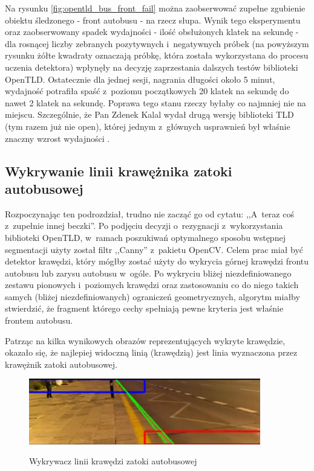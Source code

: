 Na rysunku \ref{fig:opentld_bus_front_fail} można zaobserwować 
zupełne zgubienie obiektu 
śledzonego - 
front autobusu - na rzecz słupa. Wynik tego eksperymentu oraz
zaobserwowany spadek wydajności - ilość obsłużonych klatek na sekundę - 
dla rosnącej liczby zebranych pozytywnych i~negatywnych próbek
(na powyższym rysunku żółte kwadraty oznaczają próbkę, która została
wykorzystana do procesu uczenia detektora) 
wpłynęły na decyzję zaprzestania dalszych testów biblioteki OpenTLD.
Ostatecznie dla jednej sesji,
nagrania długości około 5 minut, wydajność potrafiła spaść z~poziomu
początkowych 20 klatek na sekundę do nawet 2 klatek na sekundę.
Poprawa tego stanu 
rzeczy byłaby co najmniej nie na miejscu. Szczególnie, że Pan 
Zdenek Kalal wydał drugą wersję biblioteki TLD (tym razem już nie 
open), której jednym z~głównych usprawnień był właśnie znaczny 
wzrost wydajności
\cite{WEB:kalaltld2}.

\subsection{Wykrywanie linii krawężnika zatoki autobusowej}

Rozpoczynając ten podrozdział, trudno nie zacząć go od cytatu:
,,A~teraz coś z~zupełnie innej beczki''. Po podjęciu decyzji o~rezygnacji
z~wykorzystania
biblioteki OpenTLD, w~ramach poszukiwań optymalnego sposobu wstępnej
segmentacji użyty został filtr ,,Canny'' z~pakietu OpenCV. Celem prac
miał być detektor krawędzi, który mógłby zostać użyty do
wykrycia górnej krawędzi frontu autobusu lub zarysu autobusu w~ogóle.
Po wykryciu bliżej niezdefiniowanego zestawu pionowych i~poziomych
krawędzi oraz zastosowaniu co do niego takich samych (bliżej
niezdefiniowanych) ograniczeń geometrycznych, algorytm miałby
stwierdzić, że fragment którego cechy spełniają pewne kryteria jest
właśnie frontem autobusu.

Patrząc na kilka wynikowych obrazów reprezentujących wykryte krawędzie,
okazało się, że najlepiej 
widoczną linią (krawędzią) jest linia wyznaczona przez krawężnik
zatoki autobusowej.

\begin{figure}[h!]
    \caption{Wykrywacz linii krawędzi zatoki autobusowej}
    \centering
    \includegraphics[width=0.9\textwidth]{img/exp_bus_lane_edge_detector}
    \label{fig:bus_lane_edge_detection}
\end{figure}

